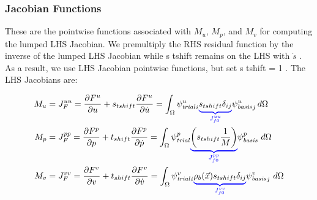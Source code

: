 \documentclass[aspectratio=169,hyperref=colorlinks]{beamer}
\begin{document}
\begin{frame}
  \frametitle{Jacobian Functions}
{\small
These are the pointwise functions associated with $M_{u}$, $M_{p}$, and $M_{v}$ for computing the lumped LHS Jacobian. We premultiply the
RHS residual function by the inverse of the lumped LHS Jacobian while s tshift remains on the LHS with $\dot{s}$ . As a result, we use
LHS Jacobian pointwise functions, but set s tshift = 1 . The LHS Jacobians are:}

\begin{align*}
M_{u} &= J_F^{uu} = \frac{\partial F^u}{\partial u} + s_{tshift} \frac{\partial F^u}{\partial \dot{u}} =
\int_{\Omega} \trialscalar[u]_{i} \eqnannotate{s_{tshift} \delta_{ij}}{J^{uu}_{f0}} \basisscalar[u]_{j} \, d \Omega \\
M_{p} &= J_F^{pp} = \frac{\partial F^p}{\partial p} + t_{shift} \frac{\partial F^p}{\partial \dot{p}} =
\int_{\Omega} \trialscalar[p] \eqnannotate{\left(s_{tshift} \frac{1}{M}\right)}{J_{f0}^{pp}} \basisscalar[p] \ d\Omega \\
M_{v} &= J_F^{vv} = \frac{\partial F^v}{\partial v} + t_{shift} \frac{\partial F^v}{\partial \dot{v}} =
\int_{\Omega} \trialscalar[v]_{i}\eqnannotate{\rho_{b}(\vec{x}) s_{tshift} \delta_{ij}}{J^{vv}_{f0}} \basisscalar[v]_{j} \  d \Omega
\end{align*}   
   
\end{frame}

\end{document}
